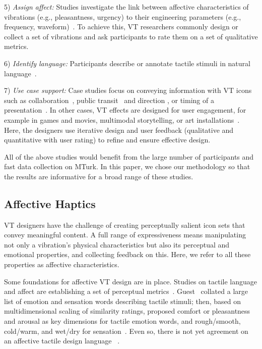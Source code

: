 5) {\em Assign affect:} Studies investigate the link between affective characteristics of vibrations (e.g., pleasantness, urgency) to their engineering parameters (e.g., frequency, waveform)~\cite{Ternes2008,affect2015,Raisamo,Koskinen}.
To achieve this, VT researchers commonly design or collect a set of vibrations and ask participants to rate them on a set of qualitative metrics.

6) {\em Identify language:} Participants describe or annotate tactile stimuli in natural language~\cite{Chan2008,Ternes2008,Obrist2013,Guest2011,Hwang2011,Seifi2015}.

7) {\em Use case support:} Case studies focus on conveying information with VT icons such as collaboration~\cite{Chan2008}, public transit~\cite{Brunet2013a} and direction \cite{Brunet2013a,Arab2015}, or timing of a presentation~\cite{presentationtiming}. In other cases, VT effects are designed for user engagement, for example in games and movies, multimodal storytelling, or art installations~\cite{Israr2014,feelcraft}. 
Here, the designers use iterative design and user feedback (qualitative and quantitative with user rating) to refine and ensure effective design.

All of the above studies would benefit from the large number of participants and fast data collection on MTurk.
In this paper, we chose our methodology so that the results are informative for a broad range of these studies.

\subsection{Affective Haptics}
VT designers have the challenge of creating perceptually salient icon sets that convey meaningful content. A full range of expressiveness means manipulating not only 
a vibration's physical characteristics but also its perceptual and %
emotional properties, and collecting feedback on this. Here, we refer to all these properties as affective characteristics. 

Some foundations for affective VT design are in place. Studies on tactile language and affect are establishing a set of perceptual metrics~\cite{Obrist2013,Seifi2015}. Guest \etal\ collated a large list of emotion and sensation words describing tactile stimuli; then, based on multidimensional scaling of similarity ratings, proposed comfort or pleasantness and arousal as key dimensions for tactile emotion words, and rough/smooth, cold/warm, and wet/dry for sensation~\cite{Obrist2013}.
Even so, there is not yet agreement on an affective tactile design language~ \cite{Jansson-Boyd2011}.

